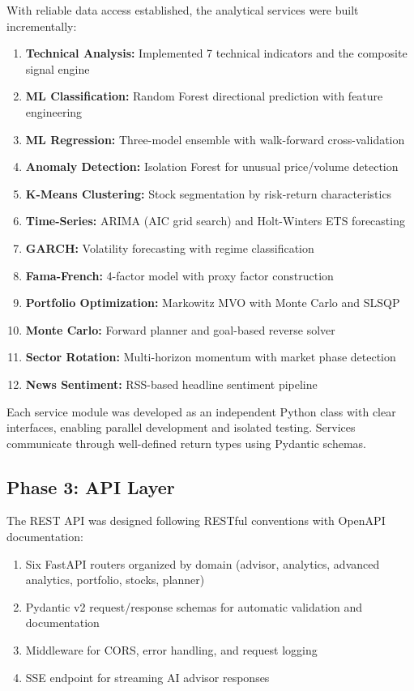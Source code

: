 \documentclass[12pt, a4paper, oneside]{report}
\begin{document}
With reliable data access established, the analytical services were built incrementally:
\begin{enumerate}[nosep]
    \item \textbf{Technical Analysis:} Implemented 7 technical indicators and the composite signal engine
    \item \textbf{ML Classification:} Random Forest directional prediction with feature engineering
    \item \textbf{ML Regression:} Three-model ensemble with walk-forward cross-validation
    \item \textbf{Anomaly Detection:} Isolation Forest for unusual price/volume detection
    \item \textbf{K-Means Clustering:} Stock segmentation by risk-return characteristics
    \item \textbf{Time-Series:} ARIMA (AIC grid search) and Holt-Winters ETS forecasting
    \item \textbf{GARCH:} Volatility forecasting with regime classification
    \item \textbf{Fama-French:} 4-factor model with proxy factor construction
    \item \textbf{Portfolio Optimization:} Markowitz MVO with Monte Carlo and SLSQP
    \item \textbf{Monte Carlo:} Forward planner and goal-based reverse solver
    \item \textbf{Sector Rotation:} Multi-horizon momentum with market phase detection
    \item \textbf{News Sentiment:} RSS-based headline sentiment pipeline
\end{enumerate}

Each service module was developed as an independent Python class with clear interfaces, enabling parallel development and isolated testing. Services communicate through well-defined return types using Pydantic schemas.

\subsection{Phase 3: API Layer}

The REST API was designed following RESTful conventions with OpenAPI documentation:
\begin{enumerate}[nosep]
    \item Six FastAPI routers organized by domain (advisor, analytics, advanced analytics, portfolio, stocks, planner)
    \item Pydantic v2 request/response schemas for automatic validation and documentation
    \item Middleware for CORS, error handling, and request logging
    \item SSE endpoint for streaming AI advisor responses
\end{enumerate}
\end{document}
